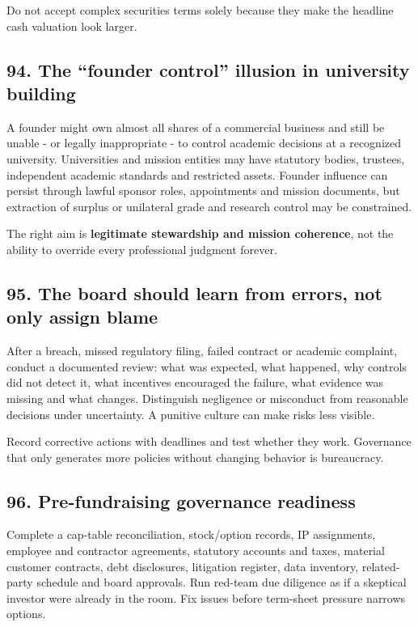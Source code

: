 Do not accept complex securities terms solely because they make the headline cash valuation look larger.

\subsection{94. The ``founder control'' illusion in university building}

A founder might own almost all shares of a commercial business and still be unable - or legally inappropriate - to control academic decisions at a recognized university. Universities and mission entities may have statutory bodies, trustees, independent academic standards and restricted assets. Founder influence can persist through lawful sponsor roles, appointments and mission documents, but extraction of surplus or unilateral grade and research control may be constrained.

The right aim is \textbf{legitimate stewardship and mission coherence}, not the ability to override every professional judgment forever.

\subsection{95. The board should learn from errors, not only assign blame}

After a breach, missed regulatory filing, failed contract or academic complaint, conduct a documented review: what was expected, what happened, why controls did not detect it, what incentives encouraged the failure, what evidence was missing and what changes. Distinguish negligence or misconduct from reasonable decisions under uncertainty. A punitive culture can make risks less visible.

Record corrective actions with deadlines and test whether they work. Governance that only generates more policies without changing behavior is bureaucracy.

\subsection{96. Pre-fundraising governance readiness}

Complete a cap-table reconciliation, stock/option records, IP assignments, employee and contractor agreements, statutory accounts and taxes, material customer contracts, debt disclosures, litigation register, data inventory, related-party schedule and board approvals. Run red-team due diligence as if a skeptical investor were already in the room. Fix issues before term-sheet pressure narrows options.

